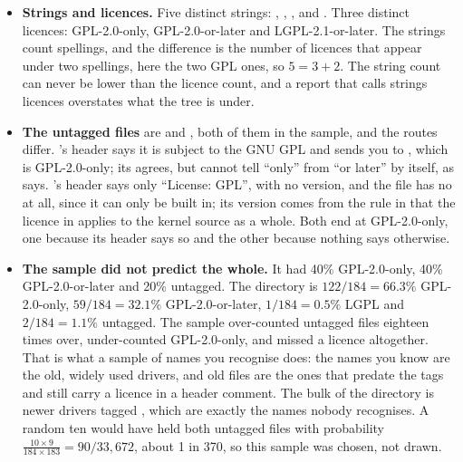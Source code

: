 \begin{itemize}
  \item \textbf{Strings and licences.} Five distinct strings: , ,
    ,  and . Three distinct licences:
    GPL-2.0-only, GPL-2.0-or-later and LGPL-2.1-or-later. The strings count spellings, and the
    difference is the number of licences that appear under two spellings, here the two GPL ones, so
    $5 = 3 + 2$. The string count can never be lower than the licence count, and a report that
    calls strings licences overstates what the tree is under.
  \item \textbf{The untagged files} are  and , both of them
    in the sample, and the routes differ. 's header says it is subject to the
    GNU GPL and sends you to , which is GPL-2.0-only; its 
    agrees, but cannot tell ``only'' from ``or later'' by itself, as 
    says. 's header says only ``License: GPL'', with no version, and the file
    has no  at all, since it can only be built in; its version comes from the
    rule in  that the licence in 
    applies to the kernel source as a whole. Both end at GPL-2.0-only, one because its header says
    so and the other because nothing says otherwise.
  \item \textbf{The sample did not predict the whole.} It had 40\% GPL-2.0-only, 40\%
    GPL-2.0-or-later and 20\% untagged. The directory is $122/184 = 66.3\%$ GPL-2.0-only,
    $59/184 = 32.1\%$ GPL-2.0-or-later, $1/184 = 0.5\%$ LGPL and $2/184 = 1.1\%$ untagged. The
    sample over-counted untagged files eighteen times over, under-counted GPL-2.0-only, and missed
    a licence altogether. That is what a sample of names you recognise does: the names you know are
    the old, widely used drivers, and old files are the ones that predate the tags and still carry
    a licence in a header comment. The bulk of the directory is newer drivers tagged
    , which are exactly the names nobody recognises. A random ten would have
    held both untagged files with probability $\frac{10 \times 9}{184 \times 183} = 90/33{,}672$,
    about 1 in 370, so this sample was chosen, not drawn.
\end{itemize}

